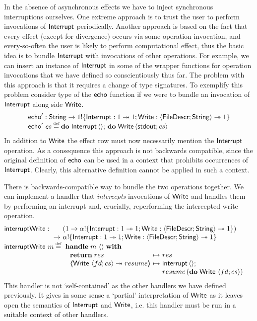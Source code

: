 \documentclass[12pt,phd,lfcs,twoside,openright,logo,leftchapter,normalheadings]{infthesis}
\theoremstyle{plain}
\theoremstyle{definition}
\begin{document}
In the absence of asynchronous effects we have to inject synchronous
interruptions ourselves.
%
One extreme approach is to trust the user to perform invocations of
$\mathsf{Interrupt}$ periodically.
%
Another approach is based on the fact that every effect (except for
divergence) occurs via some operation invocation, and every-so-often
the user is likely to perform computational effect, thus the basic
idea is to bundle $\mathsf{Interrupt}$ with invocations of other
operations. For example, we can insert an instance of $\mathsf{Interrupt}$ in
some of the wrapper functions for operation invocations that we have
defined so conscientiously thus far. The problem with this approach is
that it requires a change of type signatures. To exemplify this
problem consider type of the $\mathsf{echo}$ function if we were to bundle an
invocation of $\mathsf{Interrupt}$ along side $\mathsf{Write}$.
%
\[
  \bl
    \echo' : \String \to \UnitType \eff \{\Interrupt : \UnitType \opto \UnitType;\Write : \Record{\UFD;\String} \opto \UnitType\}\\
    \echo'~cs \defas \Do\;\Interrupt\,\Unit;\,\Do\;\Write\,\Record{\stdout;cs}
  \el
\]
%
In addition to $\mathsf{Write}$ the effect row must now necessarily mention
the $\mathsf{Interrupt}$ operation. As a consequence this approach is not
backwards compatible, since the original definition of $\mathsf{echo}$ can be
used in a context that prohibits occurrences of $\mathsf{Interrupt}$. Clearly,
this alternative definition cannot be applied in such a context.

There is backwards-compatible way to bundle the two operations
together. We can implement a handler that \emph{intercepts}
invocations of $\mathsf{Write}$ and handles them by performing an interrupt
and, crucially, reperforming the intercepted write operation.
%
\[
  \bl
  \dec{interruptWrite} :
    \ba[t]{@{~}l@{~}l}
       &(\UnitType \to \alpha \eff \{\Interrupt : \UnitType \opto \UnitType;\Write : \Record{\UFD;\String} \opto \UnitType\})\\
    \to& \alpha \eff \{\Interrupt : \UnitType \opto \UnitType;\Write : \Record{\UFD;\String} \opto \UnitType\}
    \ea\\
  \dec{interruptWrite}~m \defas
    \ba[t]{@{~}l}
      \Handle\;m~\Unit\;\With\\
        ~\ba{@{~}l@{~}c@{~}l}
           \Return\;res &\mapsto& res\\
           \OpCase{\Write}{\Record{fd;cs}}{resume} &\mapsto&
              \ba[t]{@{}l}
                \interrupt\,\Unit;\\
                resume\,(\Do\;\Write~\Record{fd;cs})
              \ea
         \ea
    \ea
  \el
\]
%
This handler is not `self-contained' as the other handlers we have
defined previously. It gives in some sense a `partial' interpretation
of $\mathsf{Write}$ as it leaves open the semantics of $\mathsf{Interrupt}$ and
$\mathsf{Write}$, i.e. this handler must be run in a suitable context of other
handlers.
\end{document}
